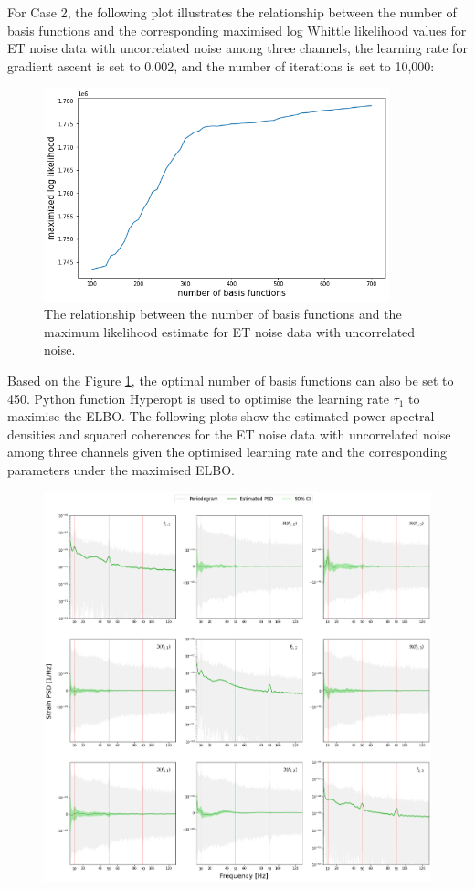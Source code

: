 \documentclass[%
 reprint,
 amsmath,amssymb,
 aps,
]{revtex4-2}
\begin{document}
For Case 2, the following plot illustrates the relationship between the number of basis functions and the corresponding maximised log Whittle likelihood values for ET noise data with uncorrelated noise among three channels, the learning rate for gradient ascent is set to 0.002, and the number of iterations is set to 10,000:
\begin{figure}
\centering
  \includegraphics[width=10cm]{num basis funs vs mls ET uncorr.png}
  \caption{The relationship between the number of basis functions and the maximum likelihood estimate for ET noise data with uncorrelated noise.}
  \label{et_uncorr_basis_funs_vs_mle}
\end{figure}

Based on the Figure \ref {et_uncorr_basis_funs_vs_mle}, the optimal number of basis functions can also be set to 450. Python function Hyperopt is used to optimise the learning rate $\tau_1$ to maximise the ELBO. The following plots show the estimated power spectral densities and squared coherences for the ET noise data with uncorrelated noise among three channels given the optimised learning rate and the corresponding parameters under the maximised ELBO.
\begin{figure}
\centering
  \includegraphics[width=15cm]{ET uncorr noise psd.png}
\end{figure}
\end{document}
